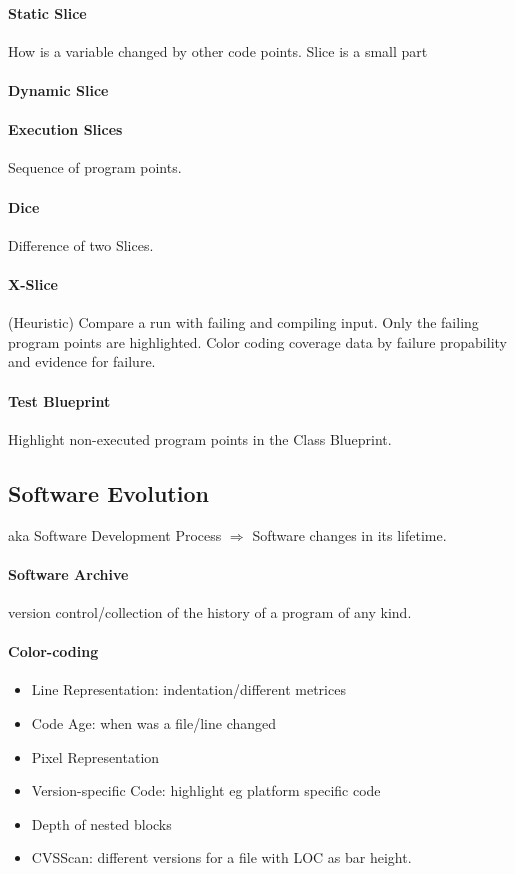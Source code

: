 \documentclass[10pt,a4paper]{article}
\begin{document}
		\paragraph{Static Slice} How is a variable changed by other code points. Slice is a small part
		\paragraph{Dynamic Slice} 
		\paragraph{Execution Slices} Sequence of program points.
		
		\paragraph{Dice} Difference of two Slices.
		
		\paragraph{X-Slice} (Heuristic) Compare a run with failing and compiling input. Only the failing program points are highlighted. Color coding coverage data by failure propability and evidence for failure.
		
		\paragraph{Test Blueprint} Highlight non-executed program points in the Class Blueprint. 
		
	
	\subsection{Software Evolution}
		aka Software Development Process $ \Rightarrow $ Software changes in its lifetime.
		
		\paragraph{Software Archive} version control/collection of the history of a program of any kind. 
		
		\paragraph{Color-coding}
		\begin{itemize}
			\item Line Representation: indentation/different metrices
			\item Code Age: when was a file/line changed
			\item Pixel Representation
			\item Version-specific Code: highlight eg platform specific code
			\item Depth of nested blocks
			\item CVSScan: different versions for a file with LOC as bar height.
		\end{itemize}
		
\end{document}
